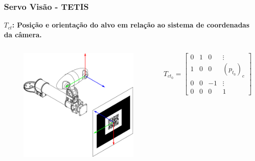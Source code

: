 \documentclass{beamer}
\newcommand\m[1]{\begin{bmatrix}#1\end{bmatrix}}
\begin{document}
\begin{frame}
\frametitle{Servo Visão - TETIS}
\textbf{$T_{ct}$: Posição e orientação do alvo em relação ao sistema de coordenadas da câmera.}
\begin{columns}[c]
\begin{figure}
\includegraphics[width=\linewidth]{./img/camera_target.eps}
\end{figure}
\begin{equation}
T_{ct_0} = \m{
	0 & 1 & 0  &\vdots \\
	1 & 0 & 0  & (p_{t_0})_c    \\
	0 & 0 & -1 &\vdots \\
	0 & 0 & 0 & 1
}
\end{equation}
\end{columns}
\end{frame}
\end{document}
